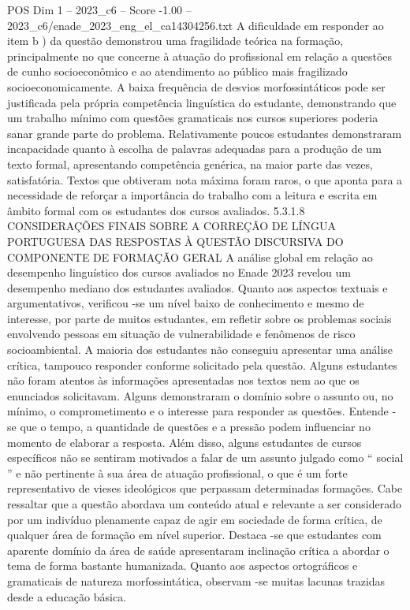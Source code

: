 \begin{textsample}{POS Dim 1 – 2023\_c6 – Score -1.00 – 2023\_c6/enade\_2023\_eng\_el\_ca14304256.txt}
A dificuldade em responder ao item b ) da questão demonstrou uma fragilidade teórica na formação, principalmente no que concerne à atuação do profissional em relação a questões de cunho socioeconômico e ao atendimento ao público mais fragilizado socioeconomicamente.
A baixa frequência de desvios morfossintáticos pode ser justificada pela própria competência linguística do estudante, demonstrando que um trabalho mínimo com questões gramaticais nos cursos superiores poderia sanar grande parte do problema.
Relativamente poucos estudantes demonstraram incapacidade quanto à escolha de palavras adequadas para a produção de um texto formal, apresentando competência genérica, na maior parte das vezes, satisfatória.
Textos que obtiveram nota máxima foram raros, o que aponta para a necessidade de reforçar a importância do trabalho com a leitura e escrita em âmbito formal com os estudantes dos cursos avaliados. 5.3.1.8 CONSIDERAÇÕES FINAIS SOBRE A CORREÇÃO DE LÍNGUA PORTUGUESA DAS RESPOSTAS À QUESTÃO DISCURSIVA DO COMPONENTE DE FORMAÇÃO GERAL A análise global em relação ao desempenho linguístico dos cursos avaliados no Enade 2023 revelou um desempenho mediano dos estudantes avaliados.
Quanto aos aspectos textuais e argumentativos, verificou -se um nível baixo de conhecimento e mesmo de interesse, por parte de muitos estudantes, em refletir sobre os problemas sociais envolvendo pessoas em situação de vulnerabilidade e fenômenos de risco socioambiental.
A maioria dos estudantes não conseguiu apresentar uma análise crítica, tampouco responder conforme solicitado pela questão.
Alguns estudantes não foram atentos às informações apresentadas nos textos nem ao que os enunciados solicitavam.
Alguns demonstraram o domínio sobre o assunto ou, no mínimo, o comprometimento e o interesse para responder as questões.
Entende -se que o tempo, a quantidade de questões e a pressão podem influenciar no momento de elaborar a resposta.
Além disso, alguns estudantes de cursos específicos não se sentiram motivados a falar de um assunto julgado como “ social ” e não pertinente à sua área de atuação profissional, o que é um forte representativo de vieses ideológicos que perpassam determinadas formações.
Cabe ressaltar que a questão abordava um conteúdo atual e relevante a ser considerado por um indivíduo plenamente capaz de agir em sociedade de forma crítica, de qualquer área de formação em nível superior.
Destaca -se que estudantes com aparente domínio da área de saúde apresentaram inclinação crítica a abordar o tema de forma bastante humanizada.
Quanto aos aspectos ortográficos e gramaticais de natureza morfossintática, observam -se muitas lacunas trazidas desde a educação básica.

\end{textsample}
